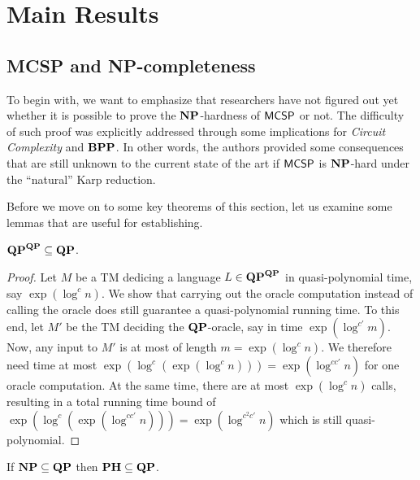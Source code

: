 \documentclass[11pt]{article}
\begin{document}
\section{Main Results}

\subsection{MCSP and NP-completeness}

To begin with, we want to emphasize that researchers have not figured out yet whether it is possible to prove the $\mathbf{NP}$-hardness of $\mathsf{MCSP}$ or not. The difficulty of such proof was explicitly addressed through some implications for \textit{Circuit Complexity} and $\mathbf{BPP}$. In other words, the authors provided some consequences that are still unknown to the current state of the art if $\mathsf{MCSP}$ is $\mathbf{NP}$-hard under the ``natural'' Karp reduction. 

Before we move on to some key theorems of this section, let us examine some lemmas that are useful for establishing.

\begin{lemma}
	\label{lem:qp-collapse}
	$\mathbf{QP}^{\mathbf{QP}} \subseteq \mathbf{QP}$.
\end{lemma}

\begin{proof}
  Let $M$ be a TM dedicing a language $L \in \mathbf{QP}^{\mathbf{QP}}$ in
  quasi-polynomial time, say $\exp(\log^c n)$.
  We show that carrying out the oracle computation instead of calling the
  oracle does still guarantee a quasi-polynomial running time. To this end,
  let $M'$ be the TM deciding the $\mathbf{QP}$-oracle, say in time
  $\exp(\log^{c'} m)$.
  Now, any input to $M'$ is at most of length $m = \exp(\log^c n)$. We
  therefore need time at most
  $\exp(\log^c (\exp(\log^c n))) = \exp(\log^{cc'} n)$
  for one oracle computation. At the same time, there are at most
  $\exp(\log^c n)$ calls, resulting in a total running time bound of
  $\exp(\log^c (\exp(\log^{cc'} n))) = \exp(\log^{c^2 c'} n)$
  which is still quasi-polynomial.
\end{proof}

\begin{lemma}
	\label{lem:ph-sub-qp}
	If $\mathbf{NP} \subseteq \mathbf{QP}$ then
	$\mathbf{PH} \subseteq \mathbf{QP}$.
\end{lemma}
\end{document}
